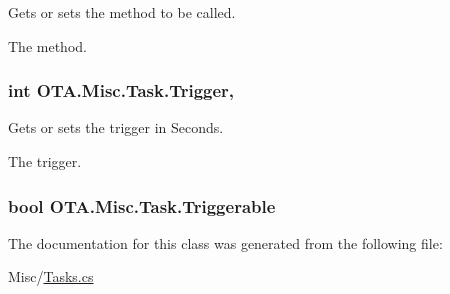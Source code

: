 Gets or sets the method to be called. 

The method. \hypertarget{class_o_t_a_1_1_misc_1_1_task_ac6e8c4aa02b4e5e43c2f0bd8984b9758}{}
\subsubsection[{Trigger}]{\setlength{\rightskip}{0pt plus 5cm}int O\+T\+A.\+Misc.\+Task.\+Trigger\hspace{0.3cm}{\ttfamily [get]}, {\ttfamily [set]}}\label{class_o_t_a_1_1_misc_1_1_task_ac6e8c4aa02b4e5e43c2f0bd8984b9758}


Gets or sets the trigger in Seconds. 

The trigger. \hypertarget{class_o_t_a_1_1_misc_1_1_task_a5bd3d3b2d8655be940f15d7d791dcdfb}{}
\subsubsection[{Triggerable}]{\setlength{\rightskip}{0pt plus 5cm}bool O\+T\+A.\+Misc.\+Task.\+Triggerable\hspace{0.3cm}{\ttfamily [get]}}\label{class_o_t_a_1_1_misc_1_1_task_a5bd3d3b2d8655be940f15d7d791dcdfb}


The documentation for this class was generated from the following file\+:\begin{DoxyCompactItemize}
\item 
Misc/\hyperlink{_tasks_8cs}{Tasks.\+cs}\end{DoxyCompactItemize}

